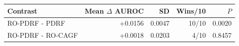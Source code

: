 \begin{tabular}{lrrrr}
\toprule
Contrast & Mean $\Delta$ AUROC & SD & Wins/10 & $P$ \\
\midrule
RO-PDRF - PDRF & +0.0156 & 0.0047 & 10/10 & 0.0020 \\
RO-PDRF - RO-CAGF & +0.0018 & 0.0203 & 4/10 & 0.8457 \\
\bottomrule
\end{tabular}